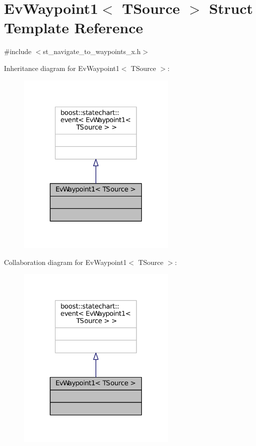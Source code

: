 \hypertarget{structEvWaypoint1}{}\section{Ev\+Waypoint1$<$ T\+Source $>$ Struct Template Reference}
\label{structEvWaypoint1}


{\ttfamily \#include $<$st\+\_\+navigate\+\_\+to\+\_\+waypoints\+\_\+x.\+h$>$}



Inheritance diagram for Ev\+Waypoint1$<$ T\+Source $>$\+:
\nopagebreak
\begin{figure}[H]
\begin{center}
\leavevmode
\includegraphics[width=218pt]{structEvWaypoint1__inherit__graph}
\end{center}
\end{figure}


Collaboration diagram for Ev\+Waypoint1$<$ T\+Source $>$\+:
\nopagebreak
\begin{figure}[H]
\begin{center}
\leavevmode
\includegraphics[width=218pt]{structEvWaypoint1__coll__graph}
\end{center}
\end{figure}


